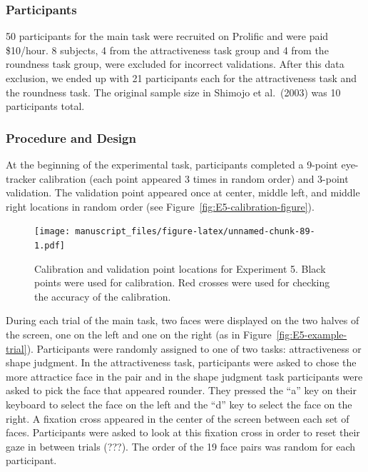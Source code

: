 \documentclass[
  man,floatsintext]{apa6}
\begin{document}
\hypertarget{participants-5}{%
\subsubsection{Participants}\label{participants-5}}

50 participants for the main task were recruited on Prolific and were
paid \$10/hour. 8 subjects, 4 from the attractiveness task group and 4 from
the roundness task group, were excluded for incorrect validations.
After this
data exclusion, we ended up with 21 participants each for the
attractiveness task and the roundness task. The original sample size in
Shimojo et al.~(2003) was 10 participants total.

\hypertarget{procedure-and-design}{%
\subsubsection{Procedure and Design}\label{procedure-and-design}}

At the beginning of the experimental task, participants completed a
9-point eye-tracker calibration (each point appeared 3 times in random
order) and 3-point validation. The validation point appeared once at
center, middle left, and middle right locations in random order (see Figure~\ref{fig:E5-calibration-figure}).

\begin{figure}
\centering
\texttt{[image: manuscript\_files/figure-latex/unnamed-chunk-89-1.pdf]}
\caption{\label{fig:unnamed-chunk-89}Calibration and validation point locations for Experiment 5. Black points were used for calibration. Red crosses were used for checking the accuracy of the calibration.}
\end{figure}

During each trial of the main task, two faces were displayed on the two
halves of the screen, one on the left and one on the right (as in Figure~\ref{fig:E5-example-trial}). Participants were randomly assigned to one of two tasks:
attractiveness or shape judgment. In the attractiveness task,
participants were asked to chose the more attractice face in the pair
and in the shape judgment task participants were asked to pick the face
that appeared rounder. They pressed the ``a'' key on their keyboard to
select the face on the left and the ``d'' key to select the face on the
right. A fixation cross appeared in the center of the screen between
each set of faces. Participants were asked to look at this fixation
cross in order to reset their gaze in between trials (???). The order of
the 19 face pairs was random for each participant.
\end{document}
